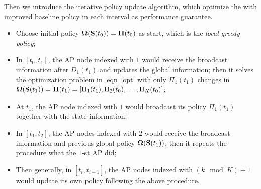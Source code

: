 Then we introduce the iterative policy update algorithm, which optimize the 
with improved baseline policy in each interval as performance guarantee.
\begin{itemize}
    \item Choose initial policy $\boldsymbol{\Omega}(\mathbf{S}(t_0)) = \boldsymbol{\Pi}(t_0)$ as start, which is the \emph{local greedy policy};
    \item In $[t_0, t_1]$, the AP node indexed with $1$ would receive the broadcast information after $D_1(t_1)$ and updates the global information; then it solves the optimization problem in \ref{eqn_opt} with only $\Pi_{1}(t_1)$ changes in $\boldsymbol{\Omega}(\mathbf{S}(t_1)) = \boldsymbol{\Pi}(t_1) = [\Pi_{1}(t_1), \Pi_{2}(t_0), \dots, \Pi_{K}(t_0)]$;
    \item At $t_1$, the AP node indexed with $1$ would broadcast its policy $\Pi_{1}(t_1)$ together with the state information;
    \item In $[t_1, t_2]$, the AP nodes indexed with $2$ would receive the broadcast information and previous global policy $\boldsymbol{\Omega}(\mathbf{S}(t_1))$; then it repeats the procedure what the $1$-st AP did;
    \item Then generally, in $[t_{i}, t_{i+1}]$, the AP nodes indexed with $(k \mod K)+1$ would update its own policy following the above procedure.
\end{itemize}


